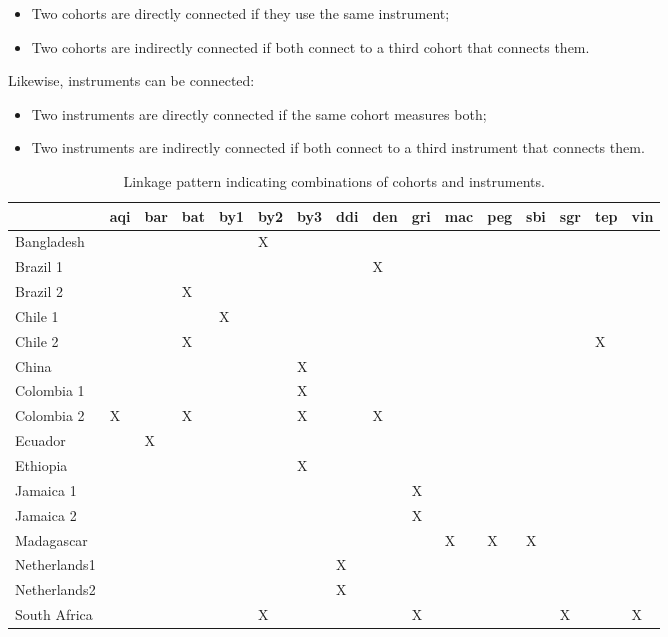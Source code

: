 \documentclass[
]{book}
\providecommand{\tightlist}{%
  \setlength{\itemsep}{0pt}\setlength{\parskip}{0pt}}
\begin{document}
\begin{itemize}
\tightlist
\item
  Two cohorts are directly connected if they use the same instrument;
\item
  Two cohorts are indirectly connected if both connect to a third cohort that connects them.
\end{itemize}

Likewise, instruments can be connected:

\begin{itemize}
\tightlist
\item
  Two instruments are directly connected if the same cohort measures both;
\item
  Two instruments are indirectly connected if both connect to a third instrument that connects them.
\end{itemize}

\begin{table}

\caption{\label{tab:linkage}Linkage pattern indicating combinations of cohorts and instruments.}
\centering
\begin{tabular}[t]{llllllllllllllll}
\toprule
  & aqi & bar & bat & by1 & by2 & by3 & ddi & den & gri & mac & peg & sbi & sgr & tep & vin\\
\midrule
Bangladesh &  &  &  &  & X &  &  &  &  &  &  &  &  &  & \\
Brazil 1 &  &  &  &  &  &  &  & X &  &  &  &  &  &  & \\
Brazil 2 &  &  & X &  &  &  &  &  &  &  &  &  &  &  & \\
Chile 1 &  &  &  & X &  &  &  &  &  &  &  &  &  &  & \\
Chile 2 &  &  & X &  &  &  &  &  &  &  &  &  &  & X & \\
\addlinespace
China &  &  &  &  &  & X &  &  &  &  &  &  &  &  & \\
Colombia 1 &  &  &  &  &  & X &  &  &  &  &  &  &  &  & \\
Colombia 2 & X &  & X &  &  & X &  & X &  &  &  &  &  &  & \\
Ecuador &  & X &  &  &  &  &  &  &  &  &  &  &  &  & \\
Ethiopia &  &  &  &  &  & X &  &  &  &  &  &  &  &  & \\
\addlinespace
Jamaica 1 &  &  &  &  &  &  &  &  & X &  &  &  &  &  & \\
Jamaica 2 &  &  &  &  &  &  &  &  & X &  &  &  &  &  & \\
Madagascar &  &  &  &  &  &  &  &  &  & X & X & X &  &  & \\
Netherlands1 &  &  &  &  &  &  & X &  &  &  &  &  &  &  & \\
Netherlands2 &  &  &  &  &  &  & X &  &  &  &  &  &  &  & \\
\addlinespace
South Africa &  &  &  &  & X &  &  &  & X &  &  &  & X &  & X\\
\bottomrule
\end{tabular}
\end{table}
\end{document}
